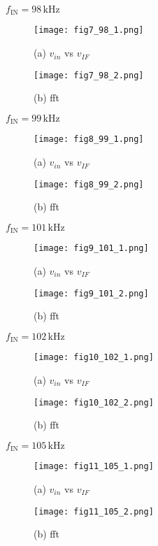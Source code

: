 \documentclass[conference]{IEEEtran}
\begin{document}
\textbf{\boldmath\( f_{\text{IN}} = 98\,\text{kHz} \)}
\begin{figure}[H]
    \centering
    \texttt{[image: fig7\_98\_1.png]}
    \caption{(a) \( v_{in} \) vs \( v_{IF} \)}
\end{figure}
\begin{figure}[H]
    \centering
    \texttt{[image: fig7\_98\_2.png]}
    \caption{(b) fft}
\end{figure}

\textbf{\boldmath\( f_{\text{IN}} = 99\,\text{kHz} \)}
\begin{figure}[H]
    \centering
    \texttt{[image: fig8\_99\_1.png]}
    \caption{(a) \( v_{in} \) vs \( v_{IF} \)}
\end{figure}
\begin{figure}[H]
    \centering
    \texttt{[image: fig8\_99\_2.png]}
    \caption{(b) fft}
\end{figure}

\textbf{\boldmath\( f_{\text{IN}} = 101\,\text{kHz} \)}
\begin{figure}[H]
    \centering
    \texttt{[image: fig9\_101\_1.png]}
    \caption{(a) \( v_{in} \) vs \( v_{IF} \)}
\end{figure}
\begin{figure}[H]
    \centering
    \texttt{[image: fig9\_101\_2.png]}
    \caption{(b) fft}
\end{figure}

\textbf{\boldmath\( f_{\text{IN}} = 102\,\text{kHz} \)}
\begin{figure}[H]
    \centering
    \texttt{[image: fig10\_102\_1.png]}
    \caption{(a) \( v_{in} \) vs \( v_{IF} \)}
\end{figure}
\begin{figure}[H]
    \centering
    \texttt{[image: fig10\_102\_2.png]}
    \caption{(b) fft}
\end{figure}

\textbf{\boldmath\( f_{\text{IN}} = 105\,\text{kHz} \)}
\begin{figure}[H]
    \centering
    \texttt{[image: fig11\_105\_1.png]}
    \caption{(a) \( v_{in} \) vs \( v_{IF} \)}
\end{figure}
\begin{figure}[H]
    \centering
    \texttt{[image: fig11\_105\_2.png]}
    \caption{(b) fft}
\end{figure}
\end{document}
